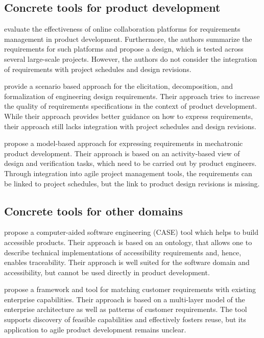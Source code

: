 \subsection{Concrete tools for product development}

\cite{Ahti2005} evaluate the effectiveness of online collaboration platforms for requirements management in product development.
Furthermore, the authors summarize the requirements for such platforms and propose a design, which is tested across several large-scale projects.
However, the authors do not consider the integration of requirements with project schedules and design revisions.

\cite{liu2012scenario} provide a scenario based approach for the elicitation, decomposition, and formalization of engineering design requirements.
Their approach tries to increase the quality of requirements specifications in the context of product development.
While their approach provides better guidance on how to express requirements, their approach still lacks integration with project schedules and design revisions.

\cite{WINDISCH2022550} propose a model-based approach for expressing requirements in mechatronic product development.
Their approach is based on an activity-based view of design and verification tasks, which need to be carried out by product engineers.
Through integration into agile project management tools, the requirements can be linked to project schedules, but the link to product design revisions is missing.

\subsection{Concrete tools for other domains}

\cite{6976693} propose a computer-aided software engineering (CASE) tool which helps to build accessible products.
Their approach is based on an ontology, that allows one to describe technical implementations of accessibility requirements and, hence, enables traceability.
Their approach is well suited for the software domain and accessibility, but cannot be used directly in product development.

\cite{belfadel2022requirements} propose a framework and tool for matching customer requirements with existing enterprise capabilities.
Their approach is based on a multi-layer model of the enterprise architecture as well as patterns of customer requirements.
The tool supports discovery of feasible capabilities and effectively fosters reuse, but its application to agile product development remains unclear.

